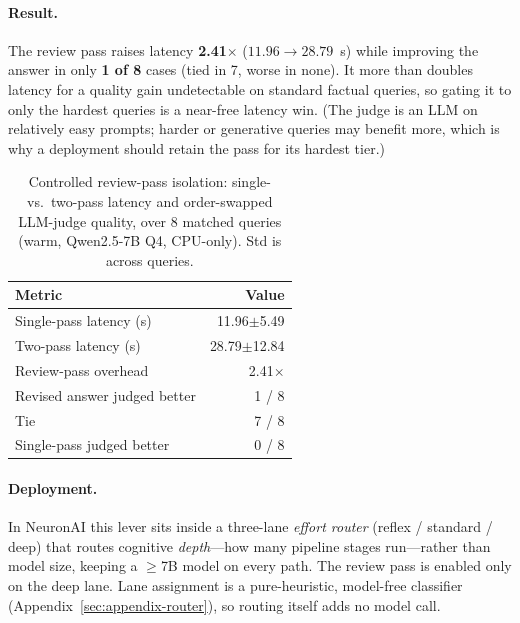 \documentclass[sigconf,nonacm,10pt]{acmart}
\begin{document}
\paragraph{Result.}
The review pass raises latency \textbf{2.41$\times$}
($11.96\rightarrow28.79$~s) while improving the answer in only \textbf{1 of
8} cases (tied in 7, worse in none). It more than doubles latency for a
quality gain undetectable on standard factual queries, so gating it to only
the hardest queries is a near-free latency win. (The judge is an LLM on
relatively easy prompts; harder or generative queries may benefit more,
which is why a deployment should retain the pass for its hardest tier.)

\begin{table}[t]
  \centering
  \caption{Controlled review-pass isolation: single- vs.\ two-pass latency
  and order-swapped LLM-judge quality, over 8 matched queries (warm,
  Qwen2.5-7B Q4, CPU-only). Std is across queries.}
  \label{tab:reviewpass}
  \small
  \begin{tabular}{lr}
    \toprule
    Metric & Value \\
    \midrule
    Single-pass latency (s)       & 11.96$\pm$5.49 \\
    Two-pass latency (s)          & 28.79$\pm$12.84 \\
    Review-pass overhead          & 2.41$\times$ \\
    \midrule
    Revised answer judged better  & 1 / 8 \\
    Tie                           & 7 / 8 \\
    Single-pass judged better     & 0 / 8 \\
    \bottomrule
  \end{tabular}
\end{table}

\paragraph{Deployment.}
In NeuronAI this lever sits inside a three-lane \emph{effort router} (reflex
/ standard / deep) that routes cognitive \emph{depth}---how many pipeline
stages run---rather than model size, keeping a $\geq$7B model on every path.
The review pass is enabled only on the deep lane. Lane assignment is a
pure-heuristic, model-free classifier (Appendix~\ref{sec:appendix-router}),
so routing itself adds no model call.

\end{document}
